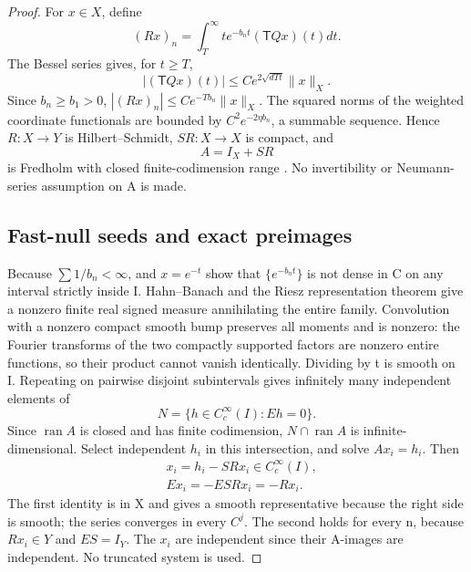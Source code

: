 \begin{proof}
For \(x\in X\), define
\begin{equation}\label{eq:3-8}
(Rx)_n=\int_T^\infty t e^{-b_nt}(\mathsf TQx)(t)dt.
\end{equation}
The Bessel series gives, for \(t\ge T\),
\begin{equation}\label{eq:3-9}
|(\mathsf TQx)(t)|\le C e^{2\sqrt{dTt}}\|x\|_X.
\end{equation}
Since \(b_n\ge b_1>0\), \(|(Rx)_n|\le C e^{-Tb_n}\|x\|_X\). The squared norms of the weighted coordinate functionals are bounded by \(C^2e^{-2\eta b_n}\), a summable sequence. Hence \(R:X\to Y\) is Hilbert--Schmidt, \(SR:X\to X\) is compact, and
\begin{equation}\label{eq:3-10}
A=I_X+SR
\end{equation}
is Fredholm with closed finite-codimension range \cite{Howard2020}. No invertibility or Neumann-series assumption on A is made.

\subsection{Fast-null seeds and exact preimages}

Because \(\sum 1/b_n<\infty\), \cite[Theorem~29]{Almira2007} and \(x=e^{-t}\) show that \(\{e^{-b_nt}\}\) is not dense in C on any interval strictly inside I. Hahn--Banach and the Riesz representation theorem \cite{RieszNotes} give a nonzero finite real signed measure annihilating the entire family. Convolution with a nonzero compact smooth bump preserves all moments and is nonzero: the Fourier transforms of the two compactly supported factors are nonzero entire functions, so their product cannot vanish identically. Dividing by t is smooth on I. Repeating on pairwise disjoint subintervals gives infinitely many independent elements of
\begin{equation}\label{eq:3-11}
N=\{h\in C_c^\infty(I):Eh=0\}.
\end{equation}
Since \(\operatorname{ran}A\) is closed and has finite codimension, \(N\cap\operatorname{ran}A\) is infinite-dimensional. Select independent \(h_i\) in this intersection, and solve \(Ax_i=h_i\). Then
\begin{equation}\label{eq:3-12}
\begin{aligned}
&x_i=h_i-SRx_i\in C_c^\infty(I),\\
& Ex_i=-ESRx_i=-Rx_i.
\end{aligned}
\end{equation}
The first identity is in X and gives a smooth representative because the right side is smooth; the series converges in every \(C^j\). The second holds for every n, because \(Rx_i\in Y\) and \(ES=I_Y\). The \(x_i\) are independent since their A-images are independent. No truncated system is used.


\end{proof}
